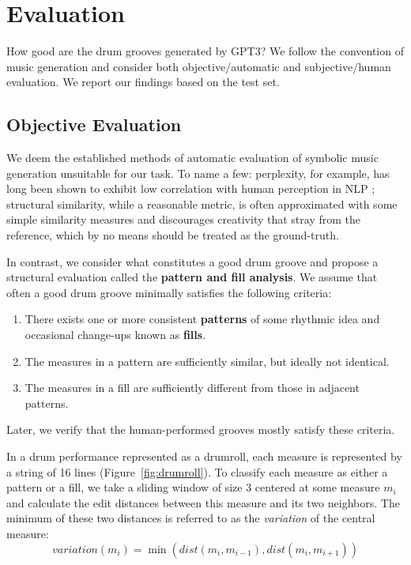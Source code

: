 \documentclass[letterpaper]{article} %
\begin{document}
\section{Evaluation}
How good are the drum grooves generated by GPT3? We follow the convention of music generation and consider both objective/automatic and subjective/human evaluation. We report our findings based on the test set.

\subsection{Objective Evaluation}

We deem the established methods of automatic evaluation of symbolic music generation unsuitable for our task. To name a few: perplexity, for example, has long been shown to exhibit low correlation with human perception in NLP \cite{kuribayashi-etal-2021-lower}; structural similarity, while a reasonable metric, is often approximated with some simple similarity measures \cite{https://doi.org/10.48550/arxiv.2210.10349} and discourages creativity that stray from the reference, which by no means should be treated as the ground-truth.

In contrast, we consider what constitutes a good drum groove and propose a structural evaluation called the \textbf{pattern and fill analysis}. We assume that often a good drum groove minimally satisfies the following criteria:
\begin{enumerate}
    \item There exists one or more consistent \textbf{patterns} of some rhythmic idea and occasional change-ups known as \textbf{fills}.
    \item The measures in a pattern are sufficiently similar, but ideally not identical.
    \item The measures in a fill are sufficiently different from those in adjacent patterns.
\end{enumerate}

Later, we verify that the human-performed grooves mostly satisfy these criteria.

In a drum performance represented as a drumroll, each measure is represented by a string of 16 lines (Figure~\ref{fig:drumroll}). To classify each measure as either a pattern or a fill, we take a sliding window of size 3 centered at some measure $m_i$ and calculate the edit distances between this measure and its two neighbors. The minimum of these two distances is referred to as the \textit{variation} of the central measure:
$$\textit{variation}(m_i) = \min (dist(m_i,m_{i-1}),dist(m_i,m_{i+1}))$$
\end{document}
